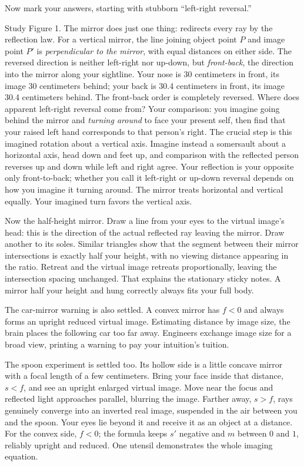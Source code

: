 \begin{mainline}


Now mark your answers, starting with stubborn ``left-right reversal.''

Study Figure 1. The mirror does just one thing: redirects every ray by the reflection law. For a vertical mirror, the line joining object point $P$ and image point $P'$ is \emph{perpendicular to the mirror}, with equal distances on either side. The reversed direction is neither left-right nor up-down, but \emph{front-back}, the direction into the mirror along your sightline. Your nose is 30 centimeters in front, its image 30 centimeters behind; your back is 30.4 centimeters in front, its image 30.4 centimeters behind. The front-back order is completely reversed. Where does apparent left-right reversal come from? Your comparison: you imagine going behind the mirror and \emph{turning around} to face your present self, then find that your raised left hand corresponds to that person's right. The crucial step is this imagined rotation about a vertical axis. Imagine instead a somersault about a horizontal axis, head down and feet up, and comparison with the reflected person reverses up and down while left and right agree. Your reflection is your opposite only front-to-back; whether you call it left-right or up-down reversal depends on how you imagine it turning around. The mirror treats horizontal and vertical equally. Your imagined turn favors the vertical axis.

Now the half-height mirror. Draw a line from your eyes to the virtual image's head: this is the direction of the actual reflected ray leaving the mirror. Draw another to its soles. Similar triangles show that the segment between their mirror intersections is exactly half your height, with no viewing distance appearing in the ratio. Retreat and the virtual image retreats proportionally, leaving the intersection spacing unchanged. That explains the stationary sticky notes. A mirror half your height and hung correctly always fits your full body.

The car-mirror warning is also settled. A convex mirror has $f<0$ and always forms an upright reduced virtual image. Estimating distance by image size, the brain places the following car too far away. Engineers exchange image size for a broad view, printing a warning to pay your intuition's tuition.

The spoon experiment is settled too. Its hollow side is a little concave mirror with a focal length of a few centimeters. Bring your face inside that distance, $s<f$, and see an upright enlarged virtual image. Move near the focus and reflected light approaches parallel, blurring the image. Farther away, $s>f$, rays genuinely converge into an inverted real image, suspended in the air between you and the spoon. Your eyes lie beyond it and receive it as an object at a distance. For the convex side, $f<0$; the formula keeps $s'$ negative and $m$ between $0$ and $1$, reliably upright and reduced. One utensil demonstrates the whole imaging equation.


\end{mainline}
